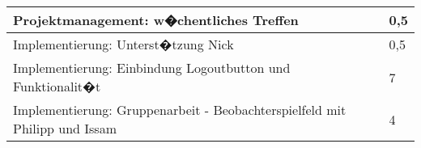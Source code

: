 \documentclass[a4paper,11pt]{scrartcl}
\begin{document}
\begin{longtable}{| p{13.8cm} | C{2.4cm} |}
  Projektmanagement: w�chentliches Treffen
	&
  0,5
	\\
	\hline

  Implementierung: Unterst�tzung Nick
	&
  0,5
	\\
	\hline

  Implementierung: Einbindung Logoutbutton und Funktionalit�t
	&
  7
	\\
	\hline

  Implementierung: Gruppenarbeit - Beobachterspielfeld mit Philipp und Issam
	&
  4
	\\
	\hline

\end{longtable}
\end{document}

